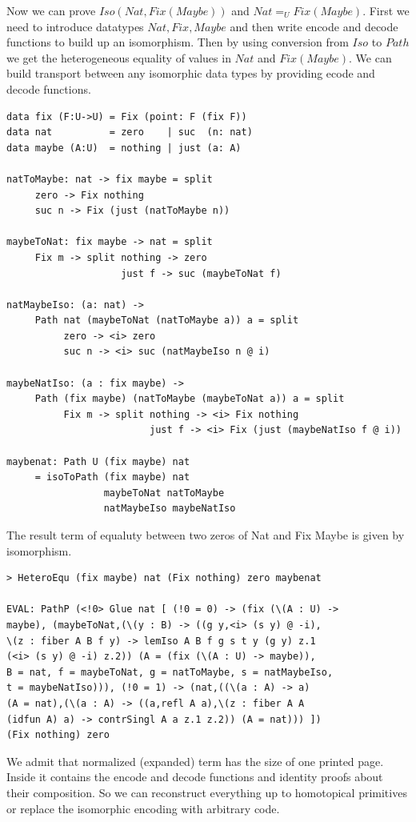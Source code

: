 \documentclass{svproc}
\begin{document}
Now we can prove $Iso(Nat, Fix(Maybe))$ and $Nat =_U Fix(Maybe)$.
First we need to introduce datatypes $Nat, Fix, Maybe$ and then write encode and decode
functions to build up an isomorphism. Then by using conversion
from $Iso$ to $Path$ we get the heterogeneous equality of values in $Nat$ and $Fix(Maybe)$.
We can build transport between any isomorphic data types by providing ecode and decode functions.

\begin{lstlisting}[mathescape=true]
data fix (F:U->U) = Fix (point: F (fix F))
data nat          = zero    | suc  (n: nat)
data maybe (A:U)  = nothing | just (a: A)

natToMaybe: nat -> fix maybe = split
     zero -> Fix nothing
     suc n -> Fix (just (natToMaybe n))

maybeToNat: fix maybe -> nat = split
     Fix m -> split nothing -> zero
                    just f -> suc (maybeToNat f)

natMaybeIso: (a: nat) ->
     Path nat (maybeToNat (natToMaybe a)) a = split
          zero -> <i> zero
          suc n -> <i> suc (natMaybeIso n @ i)

maybeNatIso: (a : fix maybe) ->
     Path (fix maybe) (natToMaybe (maybeToNat a)) a = split
          Fix m -> split nothing -> <i> Fix nothing
                         just f -> <i> Fix (just (maybeNatIso f @ i))

maybenat: Path U (fix maybe) nat
     = isoToPath (fix maybe) nat
                 maybeToNat natToMaybe
                 natMaybeIso maybeNatIso
\end{lstlisting}

The result term of equaluty between two zeros of Nat and Fix Maybe is given by isomorphism.

\begin{lstlisting}[mathescape=true]
> HeteroEqu (fix maybe) nat (Fix nothing) zero maybenat

EVAL: PathP (<!0> Glue nat [ (!0 = 0) -> (fix (\(A : U) ->
maybe), (maybeToNat,(\(y : B) -> ((g y,<i> (s y) @ -i),
\(z : fiber A B f y) -> lemIso A B f g s t y (g y) z.1
(<i> (s y) @ -i) z.2)) (A = (fix (\(A : U) -> maybe)),
B = nat, f = maybeToNat, g = natToMaybe, s = natMaybeIso,
t = maybeNatIso))), (!0 = 1) -> (nat,((\(a : A) -> a)
(A = nat),(\(a : A) -> ((a,refl A a),\(z : fiber A A
(idfun A) a) -> contrSingl A a z.1 z.2)) (A = nat))) ])
(Fix nothing) zero
\end{lstlisting}

We admit that normalized (expanded) term has the size of one printed page.
Inside it contains the encode and decode functions and identity proofs
about their composition. So we can reconstruct everything up to homotopical
primitives or replace the isomorphic encoding with arbitrary code.
\end{document}
